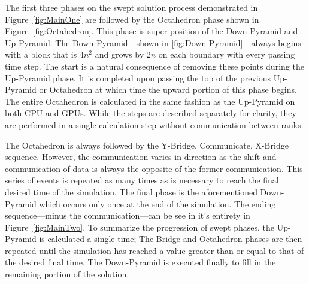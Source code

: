 \documentclass[review]{elsarticle}
\begin{document}
\par
The first three phases on the swept solution process demonstrated in Figure~\ref{fig:MainOne} are followed by the Octahedron phase shown in Figure~\ref{fig:Octahedron}. This phase is super position of the Down-Pyramid and Up-Pyramid. The Down-Pyramid---shown in \ref{fig:Down-Pyramid}---always begins with a block that is $4n^2$ and grows by $2n$ on each boundary with every passing time step. The  start is a natural consequence of removing these points during the Up-Pyramid phase. It is completed upon passing the top of the previous Up-Pyramid or Octahedron at which time the upward portion of this phase begins. The entire Octahedron is calculated in the same fashion as the Up-Pyramid on both CPU and GPUs. While the steps are described separately for clarity, they are performed in a single calculation step without communication between ranks. 

\par
The Octahedron is always followed by the Y-Bridge, Communicate, X-Bridge sequence. However, the communication varies in direction as the shift and communication of data is always the opposite of the former communication. This series of events is repeated as many times as is necessary to reach the final desired time of the simulation. The final phase is the aforementioned Down-Pyramid which occurs only once at the end of the simulation. The ending sequence---minus the communication---can be see in it's entirety in Figure~\ref{fig:MainTwo}. To summarize the progression of swept phases, the Up-Pyramid is calculated a single time; The Bridge and Octahedron phases are then repeated until the simulation has reached a value greater than or equal to that of the desired final time. The Down-Pyramid is executed finally to fill in the remaining portion of the solution.
\end{document}
